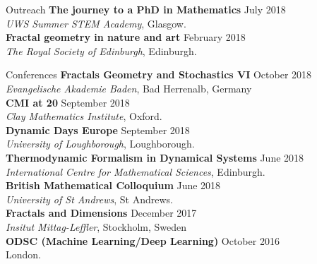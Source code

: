 \documentclass{resume} %
\begin{document}
\begin{rSection}{Outreach}
\textbf{The journey to a PhD in Mathematics} \hfill July 2018 \\\emph{UWS Summer STEM Academy}, Glasgow.\\
\textbf{Fractal geometry in nature and art} \hfill February 2018\\ \emph{The Royal Society of Edinburgh}, Edinburgh.\\
\end{rSection}

\begin{rSection}{Conferences} \itemsep -3pt 
{\textbf{Fractals Geometry and Stochastics VI}} \hfill October 2018\\ \emph{Evangelische Akademie Baden}, Bad Herrenalb, Germany\\ 
{\textbf{CMI at 20}} \hfill September 2018\\ \emph{Clay Mathematics Institute}, Oxford.\\ 
{\textbf{Dynamic Days Europe}} \hfill September 2018\\ \emph{University of Loughborough}, Loughborough.\\ 
{\textbf{Thermodynamic Formalism in Dynamical Systems}} \hfill June 2018\\ \emph{International Centre for Mathematical Sciences}, Edinburgh.\\ 
{\textbf{British Mathematical Colloquium}} \hfill June 2018\\ \emph{University of St Andrews}, {St Andrews.} \\ 
{\textbf{Fractals and Dimensions}} \hfill December 2017\\ \emph{Insitut Mittag-Leffler},{ Stockholm, Sweden} \\ 
{\textbf{ODSC (Machine Learning/Deep Learning)}} \hfill October 2016\\ London.  \\ 
\end{rSection}  
\end{document}
